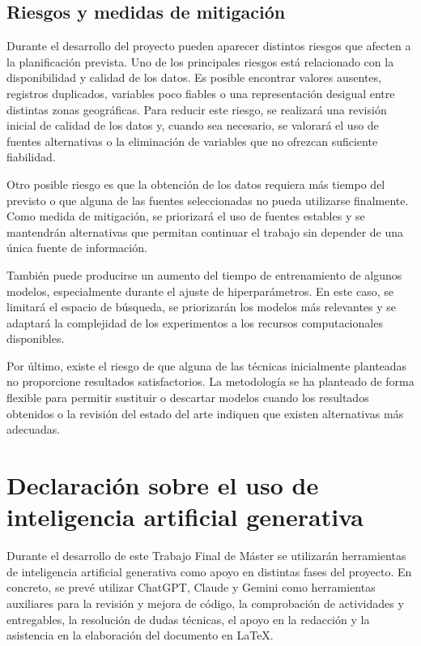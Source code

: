 \documentclass[IB]{TFUOC}%
\begin{document}
\subsection{Riesgos y medidas de mitigación}

Durante el desarrollo del proyecto pueden aparecer distintos riesgos que afecten a la planificación prevista. Uno de los principales riesgos está relacionado con la disponibilidad y calidad de los datos. Es posible encontrar valores ausentes, registros duplicados, variables poco fiables o una representación desigual entre distintas zonas geográficas. Para reducir este riesgo, se realizará una revisión inicial de calidad de los datos y, cuando sea necesario, se valorará el uso de fuentes alternativas o la eliminación de variables que no ofrezcan suficiente fiabilidad.

Otro posible riesgo es que la obtención de los datos requiera más tiempo del previsto o que alguna de las fuentes seleccionadas no pueda utilizarse finalmente. Como medida de mitigación, se priorizará el uso de fuentes estables y se mantendrán alternativas que permitan continuar el trabajo sin depender de una única fuente de información.

También puede producirse un aumento del tiempo de entrenamiento de algunos modelos, especialmente durante el ajuste de hiperparámetros. En este caso, se limitará el espacio de búsqueda, se priorizarán los modelos más relevantes y se adaptará la complejidad de los experimentos a los recursos computacionales disponibles.

Por último, existe el riesgo de que alguna de las técnicas inicialmente planteadas no proporcione resultados satisfactorios. La metodología se ha planteado de forma flexible para permitir sustituir o descartar modelos cuando los resultados obtenidos o la revisión del estado del arte indiquen que existen alternativas más adecuadas.

\section{Declaración sobre el uso de inteligencia artificial generativa}

Durante el desarrollo de este Trabajo Final de Máster se utilizarán herramientas de inteligencia artificial generativa como apoyo en distintas fases del proyecto. En concreto, se prevé utilizar ChatGPT, Claude y Gemini como herramientas auxiliares para la revisión y mejora de código, la comprobación de actividades y entregables, la resolución de dudas técnicas, el apoyo en la redacción y la asistencia en la elaboración del documento en \LaTeX.
\end{document}

